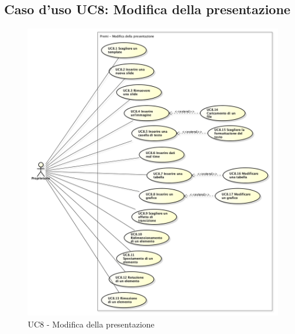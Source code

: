 \subsection{Caso d'uso UC8: Modifica della presentazione}
\begin{figure}[h] 
	\centering 
	\includegraphics[scale=0.45] {img/UC8.png} 
	\caption{UC8 - Modifica della presentazione} 
\end{figure}


